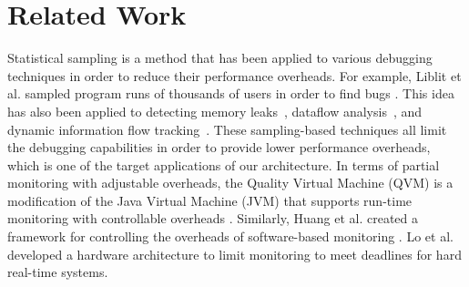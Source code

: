 \section{Related Work}
\label{sec:related}


 

Statistical sampling is a method that has been applied to various debugging
techniques in order to reduce their performance overheads. For example, Liblit
et al. sampled program runs of thousands of users in order to find bugs
\cite{liblit-pldi05}. This idea has also been applied to detecting memory
leaks~\cite{chilimbi-asplos04}, dataflow analysis~\cite{greathouse-cgo11}, and
dynamic information flow tracking~\cite{testudo-micro08}.
These sampling-based techniques all limit the debugging capabilities in order
to provide lower performance overheads, which is one of the target applications of our architecture.
In terms of partial monitoring with adjustable overheads, the Quality Virtual Machine (QVM) is a
modification of the Java Virtual Machine (JVM) that supports run-time
monitoring with controllable overheads \cite{qvm-oopsla08}. Similarly, Huang et
al. created a framework for controlling the overheads of software-based
monitoring \cite{huang-sttt12}. 
Lo et al. \cite{lo-rtas14} developed a hardware architecture to limit
monitoring to meet deadlines for hard real-time systems.

